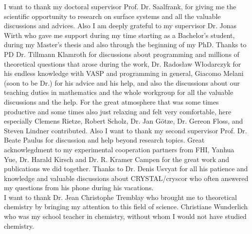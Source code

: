 \documentclass[11pt,DIV=13,BCOR=5mm,a4paper,headinclude]{scrbook}
\begin{document}
\begingroup
\renewcommand{\cleardoublepage}{}
\clearpage
{}
\endgroup
I want to thank my doctoral supervisor Prof. Dr. Saalfrank, for giving me the scientific opportunity to research on surface systems and all the valuable discussions and advices.
Also I am deeply grateful to my supervisor Dr. Jonas Wirth who gave me support during my time starting as a Bachelor's student, during my Master's thesis and also through the beginning of my PhD.
Thanks to PD Dr. Tillmann Klamroth for discussions about programming and millions of theoretical questions that arose during the work, Dr. Rados\l{}aw W\l{}odarczyk for his endless knowledge with VASP and programming in general, Giacomo Melani (soon to be Dr.) for his advice and his help, and also the discussions about our teaching duties in mathematics and the whole workgroup for all the valuable discussions and the help.
For the great atmosphere that was some times productive and some times also just relaxing and felt very comfortable, here especially Clemens Rietze, Robert Scholz, Dr. Jan Götze, Dr. Gereon Floss, and Steven Lindner contributed.
Also I want to thank my second supervisor Prof. Dr. Beate Paulus for discussion and help beyond research topics.
Great acknowlegdment to my experimental cooperation partners from FHI, Yanhua Yue, Dr. Harald Kirsch and Dr. R. Kramer Campen for the great work and publications we did together.
Thanks to Dr. Denis Usvyat for all his patience and knowledge and valuable discussions about CRYSTAL/cryscor who often answered my questions from his phone during his vacations.\\
I want to thank Dr. Jean Christophe Tremblay who brought me to theoretical chemistry by bringing my attention to this field of science.
Christiane Wunderlich who was my school teacher in chemistry, without whom I would not have studied chemistry.

\end{document}
